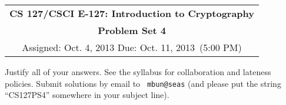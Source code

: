 \documentclass[11pt]{article}
\newcommand{\psnum}{4}
\newcommand{\assdate}{Oct. 4, 2013 \hspace{-5em}}
\newcommand{\duedate}{Oct. 11, 2013}
\newcounter{problem}
\newenvironment{problem}[1]{\stepcounter{problem}
\paragraph{Problem \theproblem. #1}}{}
\begin{document}
\begin{center}
\renewcommand{\arraystretch}{2}
\begin{tabular}{|c|}
\hline
{\large \bfseries CS 127/CSCI E-127: Introduction to Cryptography} \\

{\large \bfseries Problem Set \psnum}\\
Assigned: \assdate
\hspace{20em} Due: \duedate\ (5:00 PM)\\
\hline
\end{tabular}
\renewcommand{\arraystretch}{1}
\end{center}
\vspace{1cm}

\noindent Justify all of your answers.  See the syllabus for
collaboration and lateness policies. Submit solutions by email to {\tt
mbun@seas} (and please put the string ``CS127PS\psnum'' somewhere in your subject line).

\begin{comment}
\begin{problem}{(Computational Number Theory: Part 1)}

Do everything in this problem {\em by hand} and show your work.

\begin{enumerate}[a)]
\item Read about the extended GCD algorithm in Katz--Lindell (\S8.1).
Apply it to the primes $53$ and $71$.

\item What is the inverse of 53 modulo 71?

\item Calculate the Chinese Remainder coefficients for $53\cdot
71= 3763$, and find the element of $\Z_{3763}$ corresponding to
$(10,6)\in \Z_{53}\times \Z_{71}$.

\item Find all generators $g$ of $\Z_7^*$, and find
$\log_g 3$ for each of them.

\item Find the last (decimal) digit of $3763^{3763}$.
\end{enumerate}

\end{problem}
\end{comment}
\end{document}
